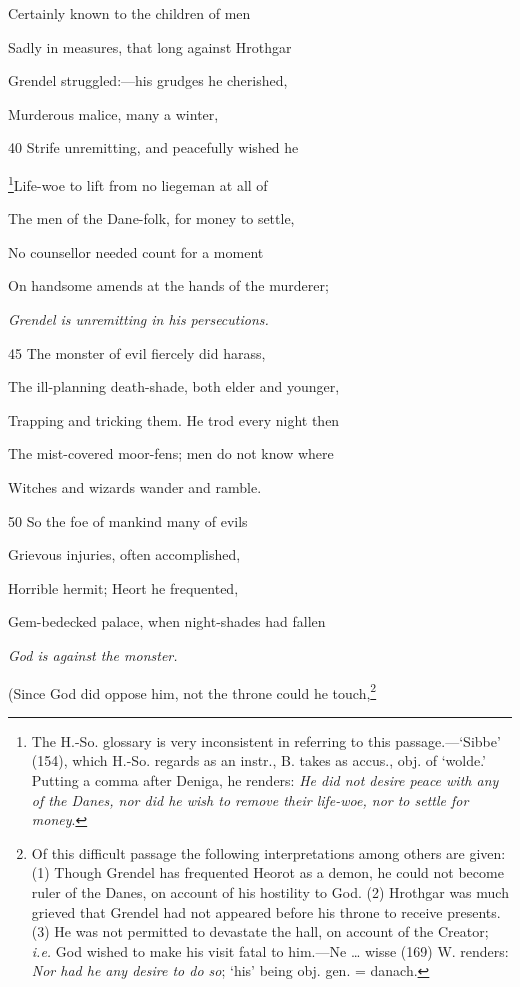 Certainly known to the children of men

Sadly in measures, that long against Hrothgar

Grendel struggled:—his grudges he cherished,

Murderous malice, many a winter,

40
Strife unremitting, and peacefully wished he

\footnote{The H.-So. glossary is very inconsistent in referring to this passage.—‘Sibbe’
(154), which H.-So. regards as an instr., B. takes as accus., obj. of
‘wolde.’ Putting a comma after Deniga, he renders: \emph{He did not desire
peace with any of the Danes, nor did he wish to remove their life-woe, nor to
settle for money}.}Life-woe to lift from no liegeman at all of

The men of the Dane-folk, for money to settle,

No counsellor needed count for a moment

On handsome amends at the hands of the murderer;

\emph{Grendel is unremitting
in his persecutions.}

45
The monster of evil fiercely did harass,

The ill-planning death-shade, both elder and younger,

Trapping and tricking them. He trod every night then

The mist-covered moor-fens; men do not know where

Witches and wizards wander and ramble.

50
So the foe of mankind many of evils

Grievous injuries, often accomplished,

Horrible hermit; Heort he frequented,

Gem-bedecked palace, when night-shades had fallen

\emph{God is against the
monster.}

(Since God did oppose him, not the throne could he touch,\footnote{Of this difficult passage the following interpretations among others are
given: (1) Though Grendel has frequented Heorot as a demon, he could not
become ruler of the Danes, on account of his hostility to God. (2) Hrothgar
was much grieved that Grendel had not appeared before his throne to receive
presents. (3) He was not permitted to devastate the hall, on account of the
Creator; \emph{i.e.} God wished to make his visit fatal to him.—Ne … wisse (169)
W. renders: \emph{Nor had he any desire to do so}; ‘his’ being obj. gen. = danach.}

